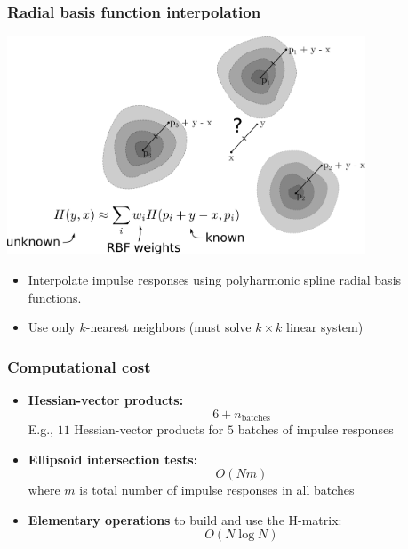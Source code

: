 \documentclass[10pt,final,xcolor=dvipsnames]{beamer}
\begin{document}
\begin{frame}
	\frametitle{Radial basis function interpolation}
	\begin{center}
		\includegraphics[width=0.8\textwidth]{interpolation_rbf.pdf}
	\end{center}
	\begin{itemize}
		\item Interpolate impulse responses using polyharmonic spline radial basis functions.
		\item Use only $k$-nearest neighbors (must solve $k \times k$ linear system)
	\end{itemize}
\end{frame}

\begin{frame}
	\frametitle{Computational cost}
	\begin{itemize}
	  	\setlength\itemsep{2em}
		\item \textbf{Hessian-vector products:} 
		$$6 + n_\text{batches}$$
		E.g., $11$ Hessian-vector products for $5$ batches of impulse responses
		\item \textbf{Ellipsoid intersection tests:}
		$$O(Nm)$$
		where $m$ is total number of impulse responses in all batches
		\item \textbf{Elementary operations} to build and use the H-matrix:
		$$O(N \log N)$$ 
	\end{itemize}
\end{frame}



\end{document}
